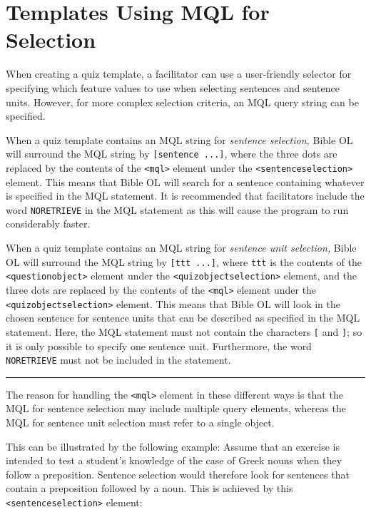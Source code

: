 \documentclass[11pt,oneside,a4paper]{memoir}
\newcommand*{\xml}[1]{\texttt{<#1>}}
\begin{document}
\section{Templates Using MQL for Selection}\label{sec-mql-selection}

When creating a quiz template, a facilitator can use a user-friendly selector for specifying which
feature values to use when selecting sentences and sentence units. However, for more complex
selection criteria, an MQL query string can be specified.

When a quiz template contains an MQL string for \emph{sentence selection,} Bible OL will surround
the MQL string by \texttt{[sentence ...]}, where the three dots are replaced by the contents of the
\xml{mql} element under the \xml{sentenceselection} element. This means that Bible OL will search
for a sentence containing whatever is specified in the MQL statement. It is recommended that
facilitators include the word \texttt{NORETRIEVE} in the MQL statement as this
will cause the program to run considerably faster.

When a quiz template contains an MQL string for \emph{sentence unit selection,}
Bible OL will surround the MQL string by \texttt{[ttt ...]}, where \texttt{ttt} is the contents of
the \xml{questionobject} element under the \xml{quizobjectselection} element, and the three dots are
replaced by the contents of the \xml{mql} element under the \xml{quizobjectselection} element. This
means that Bible OL will look in the chosen sentence for sentence units that can be described as
specified in the MQL statement. Here, the MQL statement must not contain the characters \texttt{[}
  and \texttt{]}; so it is only possible to specify one sentence unit. Furthermore, the word
\texttt{NORETRIEVE} must not be included in the statement.

\pfbreak

The reason for handling the \xml{mql} element in these different ways is that the MQL for sentence
selection may include multiple query elements, whereas the MQL for sentence unit selection must
refer to a single object.

This can be illustrated by the following example: Assume that an exercise is intended to test a
student's knowledge of the case of Greek nouns when they follow a preposition. Sentence selection
would therefore look for sentences that contain a preposition followed by a noun. This is achieved
by this \xml{sentenceselection}\index{sentenceselection@\xml{sentenceselection}} element:
\end{document}
